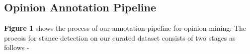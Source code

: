 \documentclass[sigconf, review]{acmart}
\begin{document}









        



\subsection{Opinion Annotation Pipeline}

\textbf{Figure 1} shows the process of our annotation pipeline for opinion mining.
The process for stance detection on our curated dataset consists of two stages as follows - 
\end{document}
